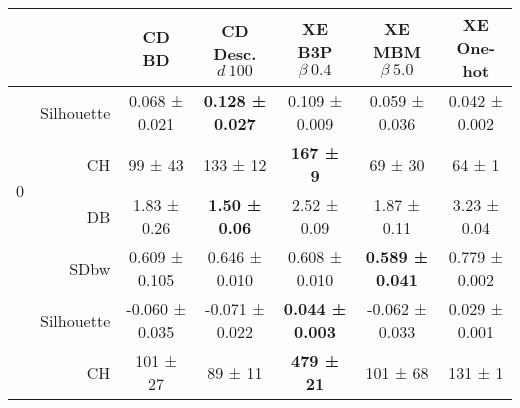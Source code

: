 \begin{tabularx}{\linewidth}{X r *{5}{c}}
\toprule
 &  & CD BD & CD Desc. $d\:100$ & XE B3P $\beta\:0.4$ & XE MBM $\beta\:5.0$ & XE One-hot \\
\midrule
\multirow[c]{4}{*}{0} & Silhouette & {\cellcolor[HTML]{DFF3DA}} \color[HTML]{000000} 0.068 \mdseries ± 0.021 & {\cellcolor[HTML]{73C476}} \color[HTML]{000000} \bfseries 0.128 \mdseries ± 0.027 & {\cellcolor[HTML]{9CD797}} \color[HTML]{000000} 0.109 \mdseries ± 0.009 & {\cellcolor[HTML]{E9F7E5}} \color[HTML]{000000} 0.059 \mdseries ± 0.036 & {\cellcolor[HTML]{F7FCF5}} \color[HTML]{000000} 0.042 \mdseries ± 0.002 \\
 & CH & {\cellcolor[HTML]{DAF0D4}} \color[HTML]{000000} 99 \mdseries ± 43 & {\cellcolor[HTML]{ACDEA6}} \color[HTML]{000000} 133 \mdseries ± 12 & {\cellcolor[HTML]{73C476}} \color[HTML]{000000} \bfseries 167 \mdseries ± 9 & {\cellcolor[HTML]{F4FBF1}} \color[HTML]{000000} 69 \mdseries ± 30 & {\cellcolor[HTML]{F7FCF5}} \color[HTML]{000000} 64 \mdseries ± 1 \\
 & DB & {\cellcolor[HTML]{97D492}} \color[HTML]{000000} 1.83 \mdseries ± 0.26 & {\cellcolor[HTML]{75C477}} \color[HTML]{000000} \bfseries 1.50 \mdseries ± 0.06 & {\cellcolor[HTML]{D2EDCC}} \color[HTML]{000000} 2.52 \mdseries ± 0.09 & {\cellcolor[HTML]{9BD696}} \color[HTML]{000000} 1.87 \mdseries ± 0.11 & {\cellcolor[HTML]{F7FCF5}} \color[HTML]{000000} 3.23 \mdseries ± 0.04 \\
 & SDbw & {\cellcolor[HTML]{87CD86}} \color[HTML]{000000} 0.609 \mdseries ± 0.105 & {\cellcolor[HTML]{A9DCA3}} \color[HTML]{000000} 0.646 \mdseries ± 0.010 & {\cellcolor[HTML]{86CC85}} \color[HTML]{000000} 0.608 \mdseries ± 0.010 & {\cellcolor[HTML]{75C477}} \color[HTML]{000000} \bfseries 0.589 \mdseries ± 0.041 & {\cellcolor[HTML]{F7FCF5}} \color[HTML]{000000} 0.779 \mdseries ± 0.002 \\
\hhline{-------}
\multirow[c]{4}{*}{1} & Silhouette & {\cellcolor[HTML]{F1FAEE}} \color[HTML]{000000} -0.060 \mdseries ± 0.035 & {\cellcolor[HTML]{F7FCF5}} \color[HTML]{000000} -0.071 \mdseries ± 0.022 & {\cellcolor[HTML]{73C476}} \color[HTML]{000000} \bfseries 0.044 \mdseries ± 0.003 & {\cellcolor[HTML]{F1FAEE}} \color[HTML]{000000} -0.062 \mdseries ± 0.033 & {\cellcolor[HTML]{8DD08A}} \color[HTML]{000000} 0.029 \mdseries ± 0.001 \\
 & CH & {\cellcolor[HTML]{F5FBF2}} \color[HTML]{000000} 101 \mdseries ± 27 & {\cellcolor[HTML]{F7FCF5}} \color[HTML]{000000} 89 \mdseries ± 11 & {\cellcolor[HTML]{75C477}} \color[HTML]{000000} \bfseries 479 \mdseries ± 21 & {\cellcolor[HTML]{F5FBF3}} \color[HTML]{000000} 101 \mdseries ± 68 & {\cellcolor[HTML]{F0F9EC}} \color[HTML]{000000} 131 \mdseries ± 1 \\

\end{tabularx}
